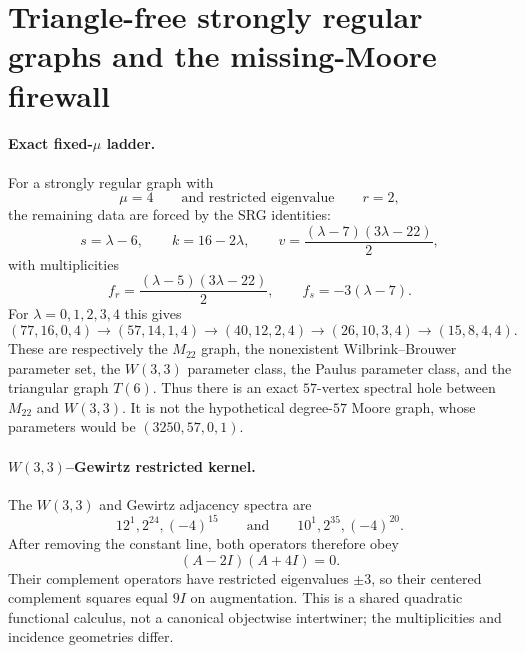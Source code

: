 \section{Triangle-free strongly regular graphs and the missing-Moore firewall}
\label{sec:bt3500-bt3505-triangle-free-srg-m57}

\paragraph{Exact fixed-$\mu$ ladder.}
For a strongly regular graph with
\[
\mu=4
\qquad\text{and restricted eigenvalue}\qquad r=2,
\]
the remaining data are forced by the SRG identities:
\[
s=\lambda-6,
\qquad
k=16-2\lambda,
\qquad
v=\frac{(\lambda-7)(3\lambda-22)}2,
\]
with multiplicities
\[
f_r=\frac{(\lambda-5)(3\lambda-22)}2,
\qquad
f_s=-3(\lambda-7).
\]
For $\lambda=0,1,2,3,4$ this gives
\[
\boxed{
(77,16,0,4)
\longrightarrow
(57,14,1,4)
\longrightarrow
(40,12,2,4)
\longrightarrow
(26,10,3,4)
\longrightarrow
(15,8,4,4).
}
\]
These are respectively the $M_{22}$ graph, the nonexistent Wilbrink--Brouwer
parameter set, the $W(3,3)$ parameter class, the Paulus parameter class, and
the triangular graph $T(6)$.  Thus there is an exact $57$-vertex spectral hole
between $M_{22}$ and $W(3,3)$.  It is not the hypothetical degree-$57$ Moore
graph, whose parameters would be $(3250,57,0,1)$.

\paragraph{$W(3,3)$--Gewirtz restricted kernel.}
The $W(3,3)$ and Gewirtz adjacency spectra are
\[
12^1,2^{24},(-4)^{15}
\qquad\text{and}\qquad
10^1,2^{35},(-4)^{20}.
\]
After removing the constant line, both operators therefore obey
\[
\boxed{(A-2I)(A+4I)=0.}
\]
Their complement operators have restricted eigenvalues $\pm3$, so their
centered complement squares equal $9I$ on augmentation.  This is a shared
quadratic functional calculus, not a canonical objectwise intertwiner; the
multiplicities and incidence geometries differ.

